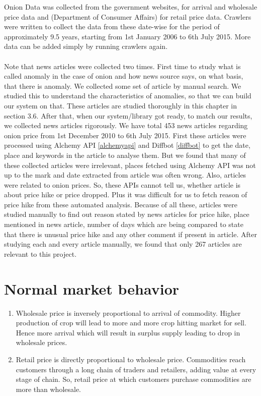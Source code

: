 Onion Data was collected from the government websites,\cite{agmarknet} for arrival and wholesale price data and \cite{retailpricecollection} (Department of Consumer Affairs) for retail price data. Crawlers were written to collect the data from these date-wise for the period of approximately 9.5 years, starting from 1st January 2006 to 6th July 2015. More data can be added simply by running crawlers again.\\
\\
Note that news articles were collected two times. First time to study what is called anomaly in the case of onion and how news source says, on what basis, that there is anomaly. We collected some set of article by manual search. We studied this to understand the characteristics of anomalies, so that we can build our system on that. These articles are studied thoroughly in this chapter in section 3.6. After that, when our system/library got ready, to match our results, we collected news articles rigorously. We have total 453 news articles regarding onion price from 1st December 2010 to 6th July 2015. First these articles were processed using Alchemy API \ref{alchemyapi} and Diffbot \ref{diffbot} to get the date, place and keywords in the article to analyse them. But we found that many of these collected articles were irrelevant, places fetched using Alchemy API was not up to the mark and date extracted from article was often wrong. Also, articles were related to onion prices. So, these APIs cannot tell us, whether article is about price hike or price dropped. Plus it was difficult for us to fetch reason of price hike from these automated analysis. Because of all these, articles were studied manually to find out reason stated by news articles for price hike, place mentioned in news article, number of days which are being compared to state that there is unusual price hike and any other comment if present in article. After studying each and every article manually, we found that only 267 articles are relevant to this project.


\section{Normal market behavior}

\begin{enumerate}

\item Wholesale price is inversely proportional to arrival of commodity. Higher production of crop will lead to more and more crop hitting market for sell. Hence more arrival which will result in surplus supply leading to drop in wholesale prices.

\item  Retail price is directly proportional to wholesale price. Commodities reach customers through a long chain of traders and retailers, adding value at every stage of chain. So, retail price at which customers purchase commodities are more than wholesale.

\end{enumerate}

